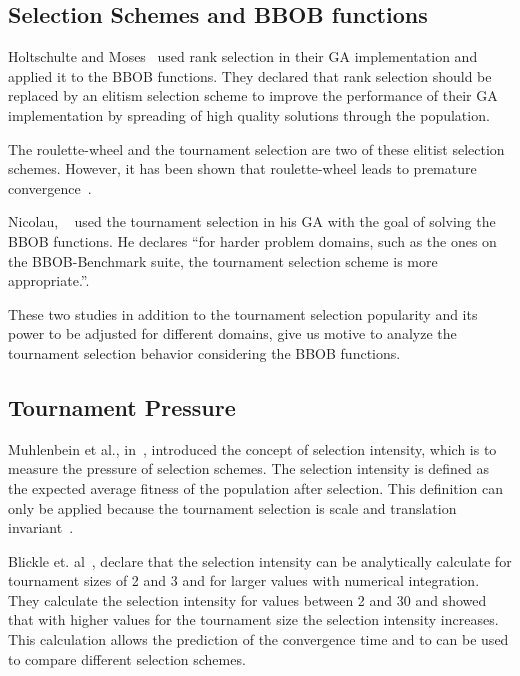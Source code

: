 \subsection{Selection Schemes and BBOB functions}



Holtschulte and Moses~\cite{holtschulte2013benchmarking} used rank selection in their GA implementation and applied it to the BBOB functions. They declared that rank selection should be replaced by an elitism selection scheme to improve the performance of their GA implementation by spreading of high quality solutions through the population. 

The roulette-wheel and the tournament selection are two of these elitist selection schemes. However, it has been shown that roulette-wheel leads to premature convergence~\cite{baker1987reducing}. 

Nicolau, ~\cite{nicolau2009application} used the tournament selection in his GA with the goal of solving the BBOB functions. He declares ``for harder problem domains, such as the ones on the BBOB-Benchmark suite, the tournament selection scheme is more appropriate.''.

These two studies in addition to the tournament selection popularity and its power to be adjusted for different domains, give us motive to analyze the tournament selection behavior considering the BBOB functions.


\subsection{Tournament Pressure}\label{sec:background:tournament_pressure} 
Muhlenbein et al., in~\cite{muhlenbein1993predictive}, introduced the concept of selection intensity, which is to measure the pressure of selection schemes. The selection intensity is defined as the expected average fitness of the population after selection. This definition can only be applied because the tournament selection is scale and translation invariant~\cite{blickle1995mathematical}.

Blickle et. al~\cite{blickle1995mathematical}, declare that the selection intensity can be analytically calculate for tournament sizes of 2 and 3 and for larger values with numerical integration. They calculate the selection intensity for values between 2 and 30 and showed that with higher values for the tournament size the selection intensity increases. This calculation allows the prediction of the convergence time and to can be used to compare different selection schemes.

